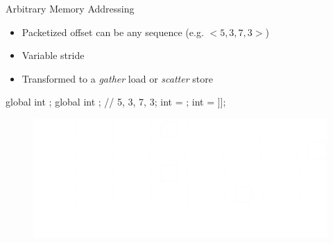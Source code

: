 \begin{frame}[fragile]{Arbitrary Memory Addressing}

\begin{itemize}
    \item Packetized offset can be any sequence (e.g. $<5, 3, 7, 3>$)
    \item Variable stride
    \item Transformed to a \emph{gather} load or \emph{scatter} store
\end{itemize}

\begin{minipage}[t]{0.40\linewidth}
    \vspace{0.1ex}
    \begin{codebox}[commandchars=\\\[\]]
    
global int \uniform[*src];
global int \uniform[*map]; // {5, 3, 7, 3};
int \varying[tid] = ;
int \varying[x] = \uniform[src]\idx[\uniform[map]\idx[\varying[tid]]];




    \end{codebox}
\end{minipage}
\hspace{2em}
\begin{minipage}[t]{0.49\linewidth}
    \vspace{0.6ex}
    \begin{figure}
        \includegraphics[width=1.0\textwidth]{images/arbitrary-access.pdf}
    \end{figure}
\end{minipage}

\end{frame}


